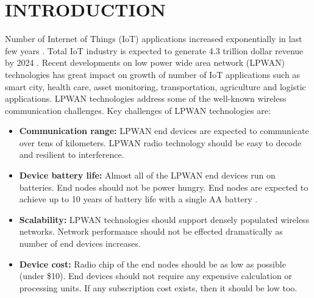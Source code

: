 \chapter{INTRODUCTION}\label{ch:introduction}

Number of Internet of Things (IoT) applications increased exponentially in last few years \cite{7721743}. Total IoT industry is expected to generate 4.3 trillion dollar revenue by 2024 \cite{7123563}. Recent developments on low power wide area network (LPWAN) technologies has great impact on growth of number of IoT applications such as smart city, health care, asset monitoring, transportation, agriculture and logistic applications. LPWAN technologies address some of the well-known wireless communication challenges. Key challenges of LPWAN technologies are:

\begin{itemize}
  \item \textbf{Communication range:} LPWAN end devices are expected to communicate over tens of kilometers. LPWAN radio technology should be easy to decode and resilient to interference.
  \item \textbf{Device battery life:} Almost all of the LPWAN end devices run on batteries. End nodes should not be power hungry. End nodes are expected to achieve up to 10 years of battery life with a single AA battery \cite{7815384}.
  \item \textbf{Scalability:} LPWAN technologies should support densely populated wireless networks. Network performance should not be effected dramatically as number of end devices increases.
  \item \textbf{Device cost:} Radio chip of the end nodes should be as low as possible (under \$10). End devices should not require any expensive calculation or processing units. If any subscription cost exists, then it should be low too.
\end{itemize}

